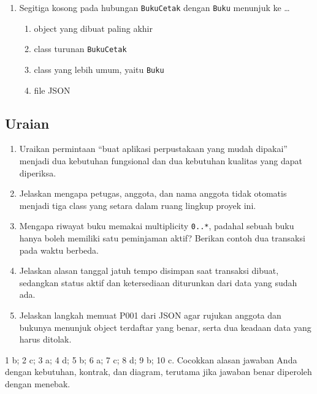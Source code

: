 \begin{enumerate}
\begin{enumerate}[label=\alph*.,itemsep=0pt]
    \item menyimpan gambar tampilan GUI saja
    \item menyimpan object Python langsung dengan \texttt{json.dump()} tanpa konversi
  \end{enumerate}
  \item Segitiga kosong pada hubungan \texttt{BukuCetak} dengan \texttt{Buku} menunjuk ke \ldots
  \begin{enumerate}[label=\alph*.,itemsep=0pt]
    \item object yang dibuat paling akhir
    \item class turunan \texttt{BukuCetak}
    \item class yang lebih umum, yaitu \texttt{Buku}
    \item file JSON
  \end{enumerate}
\end{enumerate}

\subsection{Uraian}

\begin{enumerate}
  \item Uraikan permintaan ``buat aplikasi perpustakaan yang mudah dipakai'' menjadi dua kebutuhan fungsional dan dua kebutuhan kualitas yang dapat diperiksa.
  \item Jelaskan mengapa petugas, anggota, dan nama anggota tidak otomatis menjadi tiga class yang setara dalam ruang lingkup proyek ini.
  \item Mengapa riwayat buku memakai multiplicity \texttt{0..*}, padahal sebuah buku hanya boleh memiliki satu peminjaman aktif? Berikan contoh dua transaksi pada waktu berbeda.
  \item Jelaskan alasan tanggal jatuh tempo disimpan saat transaksi dibuat, sedangkan status aktif dan ketersediaan diturunkan dari data yang sudah ada.
  \item Jelaskan langkah memuat P001 dari JSON agar rujukan anggota dan bukunya menunjuk object terdaftar yang benar, serta dua keadaan data yang harus ditolak.
\end{enumerate}

\begin{info}
1 b; 2 c; 3 a; 4 d; 5 b; 6 a; 7 c; 8 d; 9 b; 10 c. Cocokkan alasan jawaban Anda dengan kebutuhan, kontrak, dan diagram, terutama jika jawaban benar diperoleh dengan menebak.
\end{info}

